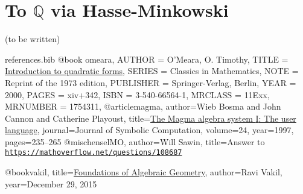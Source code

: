 \documentclass[10pt,a4paper]{amsart}
\numberwithin{equation}{section}
\numberwithin{figure}{section}
\theoremstyle{definition}
\theoremstyle{remark}
\theoremstyle{plain}
\theoremstyle{plain}
\theoremstyle{definition}
\theoremstyle{plain}
\theoremstyle{plain}
\begin{document}
    \section{To $\mathbb{Q}$ via Hasse-Minkowski} (to be written)

\begin{filecontents}{references.bib}
@book {omeara,
    AUTHOR = {O'Meara, O. Timothy},
     TITLE = {\href{https://link.springer.com/book/10.1007\%2F978-3-642-62031-7}{Introduction to quadratic forms}},
    SERIES = {Classics in Mathematics},
      NOTE = {Reprint of the 1973 edition},
 PUBLISHER = {Springer-Verlag, Berlin},
      YEAR = {2000},
     PAGES = {xiv+342},
      ISBN = {3-540-66564-1},
   MRCLASS = {11Exx},
  MRNUMBER = {1754311},
}
@article{magma,
author={Wieb Bosma and John Cannon and Catherine Playoust},
title={\href{http://www.sciencedirect.com/science/article/pii/S074771719690125X}{The Magma algebra system {I}: The user language}},
journal={Journal of Symbolic Computation},
volume={24},
year={1997},
pages={235--265}
}
@misc{henselMO,
	author={Will Sawin},
	title={Answer to \href{https://mathoverflow.net/questions/108687}{\texttt{https://mathoverflow.net/questions/108687}}}
}

@book{vakil,
title={\href{http://math.stanford.edu/~vakil/216blog/index.html}{Foundations of Algebraic Geometry}},
author={Ravi Vakil},
year={December 29, 2015}
}
\end{filecontents}



\end{document}
